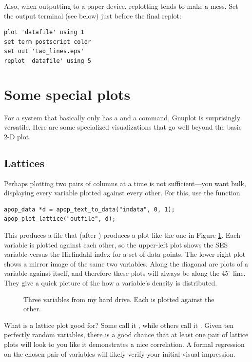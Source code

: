 Also, when outputting to a paper device, replotting tends to make a
mess. Set the output terminal (see below) just before the final replot:
\begin{lstlisting}
plot 'datafile' using 1
set term postscript color
set out 'two_lines.eps'
replot 'datafile' using 5
\end{lstlisting}

\section{Some special plots} For a system that basically only has a 
 and a  command, Gnuplot is surprisingly versatile. Here
are some specialized visualizations that go well beyond the basic 2-D
plot.

\subsection{Lattices}  
Perhaps plotting two pairs of columns at a time is not sufficient---you
want bulk, displaying every variable plotted against every other. For
this, use the  function.

\begin{lstlisting}
apop_data *d = apop_text_to_data("indata", 0, 1);
apop_plot_lattice("outfile", d);
\end{lstlisting}
This produces a file that (after ) produces
a plot like the one in Figure \ref{trellis}. Each variable is plotted
against each other, so the upper-left plot shows the SES variable
versus the Hirfindahl index for a set of data points. The lower-right
plot shows a mirror image of the same two variables. Along the diagonal
are plots of a variable against itself, and therefore these plots will
always be along the $45^\circ$ line. They give a quick picture of the
how a variable's density is distributed.

\begin{figure}
\caption{Three variables from my hard drive. Each is plotted against the
other.}\label{trellis}
\end{figure}

What is a lattice plot good for? Some call it , while others call it . Given ten perfectly
random variables, there is a good chance that at least one pair of
lattice plots will look to you like it demonstrates a nice correlation.
A formal regression on the chosen pair of variables will likely
verify your initial visual impression. 

